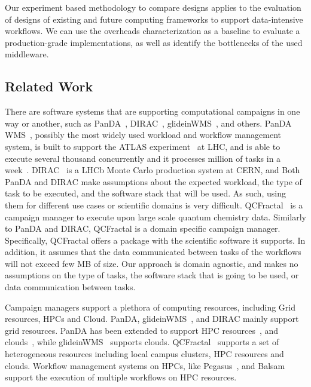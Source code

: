 Our experiment based methodology to compare designs applies to the evaluation of designs of existing and future computing frameworks to support data-intensive workflows.
We can use the overheads characterization as a baseline to evaluate a production-grade implementations, as well as identify the bottlenecks of the used middleware.


\subsection{Related Work}

There are software systems that are supporting computational campaigns in one way or another, such as PanDA~\cite{maeno2008panda}, DIRAC~\cite{casajus2010dirac}, glideinWMS~\cite{sfiligoi2008glidein}, and others. 
PanDA WMS~\cite{maeno2008panda}, possibly the most widely used workload and workflow management system, is built to support the ATLAS experiment~\cite{atlas} at LHC, and is able to execute several thousand concurrently and it processes million of tasks in a week~\cite{de2015future}.
DIRAC~\cite{tsaregorodtsev2003dirac} is a LHCb Monte Carlo production system at CERN, and 
Both PanDA and DIRAC make assumptions about the expected workload, the type of task to be executed, and the software stack that will be used.
As such, using them for different use cases or scientific domains is very difficult.
QCFractal~\cite{qcfractal} is a campaign manager to execute upon large scale quantum chemistry data.
Similarly to PanDA and DIRAC, QCFractal is a domain specific campaign manager.
Specifically, QCFractal offers a package with the scientific software it supports.
In addition, it assumes that the data communicated between tasks of the workflows will not exceed few MB of size.
Our approach is domain agnostic, and makes no assumptions on the type of tasks, the software stack that is going to be used, or data communication between tasks.

Campaign managers support a plethora of computing resources, including Grid resources, HPCs and Cloud.
PanDA, glideinWMS~\cite{sfiligoi2008glidein}, and DIRAC mainly support grid resources.
PanDA has been extended to support HPC resources~\cite{de2015future, de2016accelerating}, and clouds~\cite{de2016accelerating}, while glideinWMS~\cite{sfiligoi2008glidein} supports clouds.
QCFractal~\cite{qcfractal} supports a set of heterogeneous resources including local campus clusters, HPC resources and clouds.
Workflow management systems on HPCs, like Pegasus~\cite{deelman2015pegasus}, and Balsam~\cite{salim2019balsam} support the execution of multiple workflows on HPC resources.

